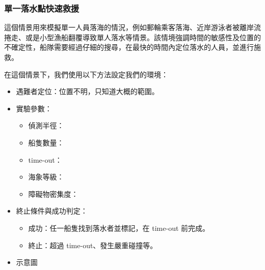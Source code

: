 \documentclass[12pt,a4paper]{ctexart}
\begin{document}
\subsubsection{單一落水點快速救援}
這個情景用來模擬單一人員落海的情況，例如郵輪乘客落海、近岸游泳者被離岸流捲走、或是小型漁船翻覆導致單人落水等情景。該情境強調時間的敏感性及位置的不確定性，船隊需要經過仔細的搜尋，在最快的時間內定位落水的人員，並進行施救。
\\ \par
在這個情景下，我們使用以下方法設定我們的環境：
\begin{itemize}
    \item 遇難者定位：位置不明，只知道大概的範圍。
    \item 實驗參數：
    \begin{itemize}
        \item 偵測半徑：
        \item 船隻數量：
        \item time-out：
        \item 海象等級：
        \item 障礙物密集度：
    \end{itemize}
    \item 終止條件與成功判定：
    \begin{itemize}
        \item 成功：任一船隻找到落水者並標記，在 time-out 前完成。
        \item 終止：超過 time-out、發生嚴重碰撞等。
    \end{itemize}
    \item 示意圖
\end{itemize}
\end{document}
